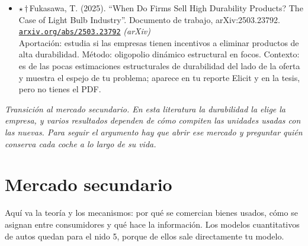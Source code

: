 \documentclass[11pt]{article}
\begin{document}
\begin{itemize}
Aportación: la inconsistencia temporal en I+D depende de si sigue vendiéndose el modelo anterior. Método: monopolio durable con innovación. Contexto: complemento técnico de Waldman (1996).
\item $\star$\,$\dagger$\,Fukasawa, T. (2025). ``When Do Firms Sell High Durability Products? The Case of Light Bulb Industry''. Documento de trabajo, arXiv:2503.23792. \href{https://arxiv.org/abs/2503.23792}{\texttt{arxiv.org/abs/2503.23792}} \textit{(arXiv)}\\
Aportación: estudia si las empresas tienen incentivos a eliminar productos de alta durabilidad. Método: oligopolio dinámico estructural en focos. Contexto: es de las pocas estimaciones estructurales de durabilidad del lado de la oferta y muestra el espejo de tu problema; aparece en tu reporte Elicit y en la tesis, pero no tienes el PDF.
\end{itemize}

\medskip
\noindent\textit{Transición al mercado secundario. En esta literatura la durabilidad la elige la empresa, y varios resultados dependen de cómo compiten las unidades usadas con las nuevas. Para seguir el argumento hay que abrir ese mercado y preguntar quién conserva cada coche a lo largo de su vida.}

\section{Mercado secundario}
Aquí va la teoría y los mecanismos: por qué se comercian bienes usados, cómo se asignan entre consumidores y qué hace la información. Los modelos cuantitativos de autos quedan para el nido 5, porque de ellos sale directamente tu modelo.
\end{document}
